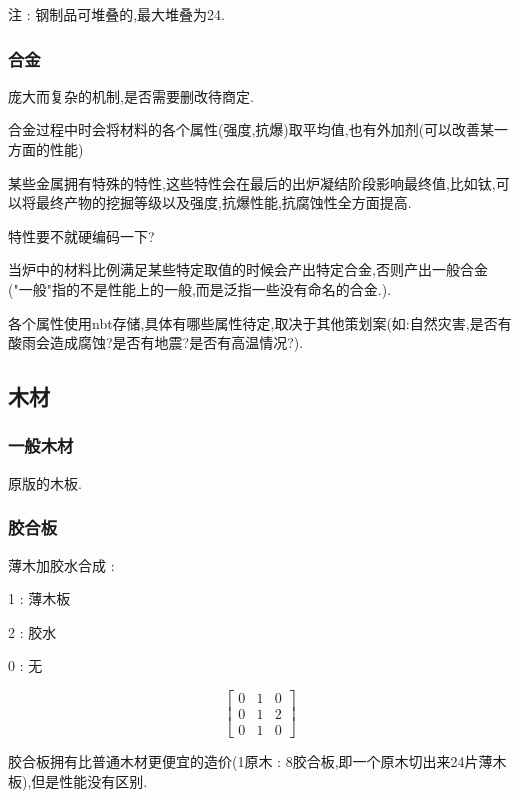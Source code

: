 {{{          注 : 钢制品可堆叠的,最大堆叠为24.
      }

      \subsubsection{合金}{
          庞大而复杂的机制,是否需要删改待商定.

          合金过程中时会将材料的各个属性(强度,抗爆)取平均值,也有外加剂(可以改善某一方面的性能)

          某些金属拥有特殊的特性,这些特性会在最后的出炉凝结阶段影响最终值,比如钛,可以将最终产物的挖掘等级以及强度,抗爆性能,抗腐蚀性全方面提高.

          特性要不就硬编码一下?

          当炉中的材料比例满足某些特定取值的时候会产出特定合金,否则产出一般合金("一般"指的不是性能上的一般,而是泛指一些没有命名的合金.).

          各个属性使用nbt存储,具体有哪些属性待定,取决于其他策划案(如:自然灾害,是否有酸雨会造成腐蚀?是否有地震?是否有高温情况?).
      }
  }

  \subsection{木材}{
      \subsubsection{一般木材}{
          原版的木板.
      }

      \subsubsection{胶合板}{
          薄木加胶水合成 :
          \begin{center}
              1 : 薄木板

              2 : 胶水

              0 : 无

              $$
                  \begin{bmatrix}
                      0 & 1 & 0 \\
                      0 & 1 & 2 \\
                      0 & 1 & 0
                  \end{bmatrix}
              $$
          \end{center}

          胶合板拥有比普通木材更便宜的造价(1原木 : 8胶合板,即一个原木切出来24片薄木板),但是性能没有区别.
      }

}}
